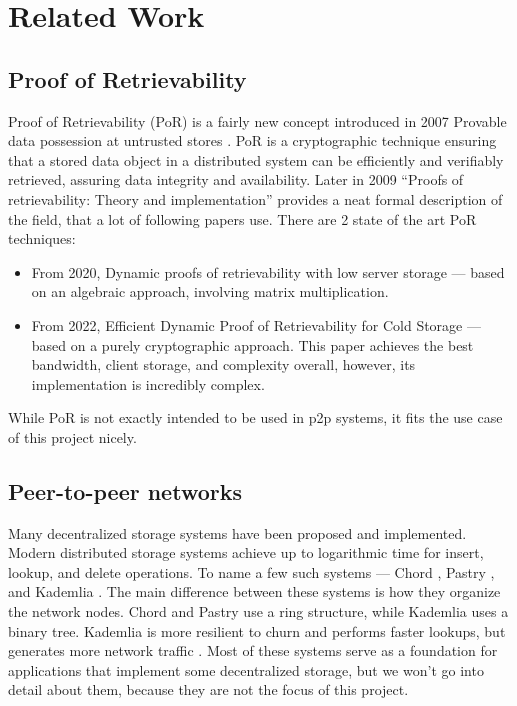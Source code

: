 \chapter{Related Work}
\label{chap:related-work}

\section{Proof of Retrievability}
Proof of Retrievability (PoR) is a fairly new concept introduced in 2007 Provable data possession at untrusted stores \cite{porveryfirtst}.
PoR is a cryptographic technique ensuring that a stored data object in a distributed system can be efficiently and verifiably retrieved, assuring data integrity and availability.
Later in 2009 “Proofs of retrievability: Theory and implementation” \cite{porfirst} provides a neat formal description of the field, that a lot of following papers use.
There are 2 state of the art PoR techniques:
\begin{itemize}
    \item From 2020, Dynamic proofs of retrievability with low server storage \cite{poralgebra} — based on an algebraic approach, involving matrix multiplication.
    \item From 2022, Efficient Dynamic Proof of Retrievability for Cold Storage \cite{pormerkle} — based on a purely cryptographic approach. This paper achieves the best bandwidth, client storage, and complexity overall, however, its implementation is incredibly complex.
\end{itemize}
While PoR is not exactly intended to be used in p2p systems, it fits the use case of this project nicely.

\section{Peer-to-peer networks}
Many decentralized storage systems have been proposed and implemented.
Modern distributed storage systems achieve up to logarithmic time for insert, lookup, and delete operations.
To name a few such systems — Chord \cite{chord}, Pastry \cite{pastry}, and Kademlia \cite{kademlia}.
The main difference between these systems is how they organize the network nodes.
Chord and Pastry use a ring structure, while Kademlia uses a binary tree.
Kademlia is more resilient to churn and performs faster lookups, but generates more network traffic \cite{kadvschordvspastry}.
Most of these systems serve as a foundation for applications that implement some decentralized storage,
but we won't go into detail about them, because they are not the focus of this project.

